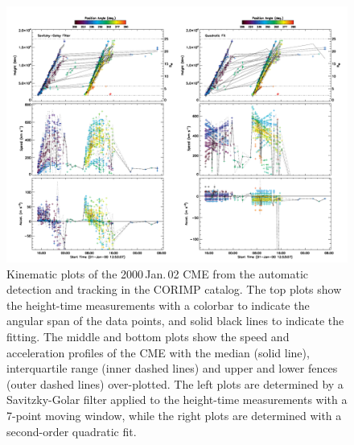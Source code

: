 \documentclass[referee,a4paper,12pt,traditabstract]{swsc}
\begin{document}
\begin{figure}[t]
\centerline{\includegraphics[width=\linewidth]{20000102_corimp_kinspd.pdf}}
\caption{Kinematic plots of the 2000\,Jan.\,02 CME from the automatic detection and tracking in the CORIMP catalog. The top plots show the height-time measurements with a colorbar to indicate the angular span of the data points, and solid black lines to indicate the fitting. The middle and bottom plots show the speed and acceleration profiles of the CME with the median (solid line), interquartile range (inner dashed lines) and upper and lower fences (outer dashed lines) over-plotted. The left plots are determined by a Savitzky-Golar filter applied to the height-time measurements with a 7-point moving window, while the right plots are determined with a second-order quadratic fit.}
\label{20000102_corimp_kinspd}
\end{figure}
\end{document}
